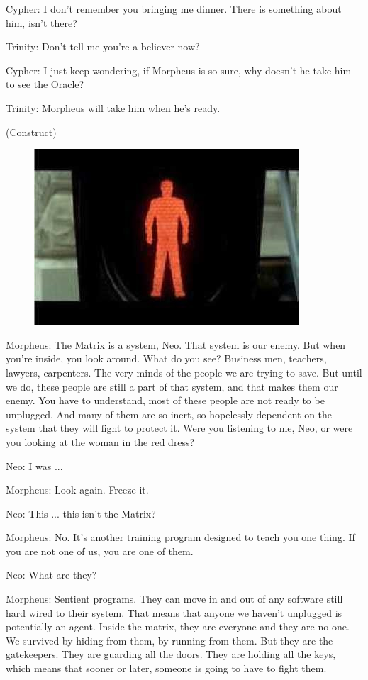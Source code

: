 \documentclass[UTF8]{ctexart}
\newenvironment{myquote}{\color{green} \setlength{\leftskip}{6em} \setlength{\rightskip}{4em} \setlength{\parindent}{-2em}}{\par}
\begin{document}
\begin{myquote}
Cypher: I don't remember you bringing me dinner. There is something about him, isn't there?

Trinity: Don't tell me you're a believer now?

Cypher: I just keep wondering, if Morpheus is so sure, why doesn't he take him to see the Oracle?

Trinity: Morpheus will take him when he's ready.

(Construct)

\begin{figure}[htb]
\centering
\includegraphics[width=0.5\linewidth]{fig/read_Matrix-33}
\end{figure}

Morpheus: The Matrix is a system, Neo. That system is our enemy. But when you're inside, you look around. What do you see? Business men, teachers, lawyers, carpenters. The very minds of the people we are trying to save. But until we do, these people are still a part of that system, and that makes them our enemy. You have to understand, most of these people are not ready to be unplugged. And many of them are so inert, so hopelessly dependent on the system that they will fight to protect it. Were you listening to me, Neo, or were you looking at the woman in the red dress?

Neo: I was ...

Morpheus: Look again. Freeze it.

Neo: This ... this isn't the Matrix?

Morpheus: No. It's another training program designed to teach you one thing. If you are not one of us, you are one of them.

Neo: What are they?

Morpheus: Sentient programs. They can move in and out of any software still hard wired to their system. That means that anyone we haven't unplugged is potentially an agent. Inside the matrix, they are everyone and they are no one. We survived by hiding from them, by running from them. But they are the gatekeepers. They are guarding all the doors. They are holding all the keys, which means that sooner or later, someone is going to have to fight them.


\end{myquote}
\end{document}
